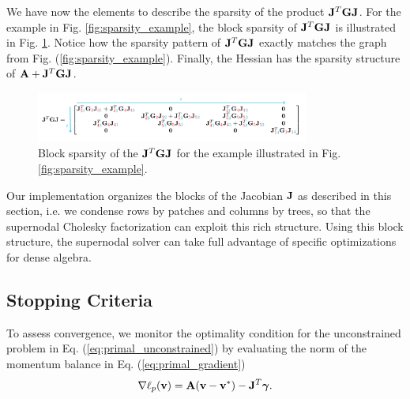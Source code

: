 We have now the elements to describe the sparsity of the product
${\mathbf{J}}^T{\mathbf{G}}{\mathbf{J}}$. For the example in Fig. \ref{fig:sparsity_example}, the
block sparsity of ${\mathbf{J}}^T{\mathbf{G}}{\mathbf{J}}$ is illustrated in Fig.
\ref{fig:JTGJ_schematic}. Notice how the sparsity pattern of
${\mathbf{J}}^T{\mathbf{G}}{\mathbf{J}}$ exactly matches the graph from Fig.
(\ref{fig:sparsity_example}). Finally, the Hessian has the sparsity
structure of ${\mathbf{A}} + {\mathbf{J}}^T{\mathbf{G}}{\mathbf{J}}$.
\begin{figure}[!h]
	\centering
	\includegraphics[width=0.8\textwidth]{figures/JTGJ_schematic.png}
	\caption{\label{fig:JTGJ_schematic} 
	Block sparsity of the ${\mathbf{J}}^T{\mathbf{G}}{\mathbf{J}}$ for the example illustrated in
	Fig. \ref{fig:sparsity_example}.}
\end{figure}

Our implementation organizes the blocks of the Jacobian ${\mathbf{J}}$ as described in
this section, i.e. we condense rows by patches and columns by trees, so that the
supernodal Cholesky factorization can exploit this rich structure. Using this
block structure, the supernodal solver can take full advantage of specific
optimizations for dense algebra.



\subsection{Stopping Criteria}
\label{sec:stopping_criteria}

To assess convergence, we monitor the optimality condition for the unconstrained
problem in Eq. (\ref{eq:primal_unconstrained}) by evaluating the norm of the
momentum balance in Eq. (\ref{eq:primal_gradient})
\begin{equation}
	\nabla\ell_p({\mathbf{v}}) = {\mathbf{A}}({\mathbf{v}}-{\mathbf{v}}^*) - {\mathbf{J}}^T{\bm\gamma}.
\end{equation}


